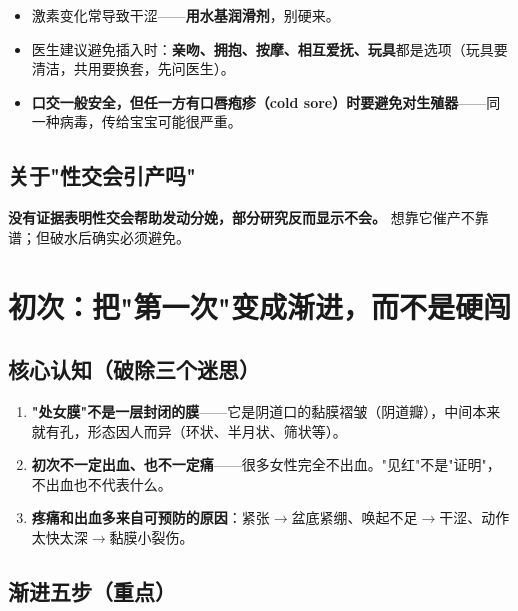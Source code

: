 \documentclass[12pt,UTF8,openany]{ctexbook}
\begin{document}
\begin{itemize}[leftmargin=2em,itemsep=0.3em]
  \item 激素变化常导致干涩——\textbf{用水基润滑剂}，别硬来。
  \item 医生建议避免插入时：\textbf{亲吻、拥抱、按摩、相互爱抚、玩具}都是选项（玩具要清洁，共用要换套，先问医生）。
  \item \textbf{口交一般安全，但任一方有口唇疱疹（cold sore）时要避免对生殖器}——同一种病毒，传给宝宝可能很严重。
\end{itemize}

\subsection{关于"性交会引产吗"}

\textbf{没有证据表明性交会帮助发动分娩，部分研究反而显示不会。} 想靠它催产不靠谱；但破水后确实必须避免。

\section{初次：把"第一次"变成渐进，而不是硬闯}

\subsection{核心认知（破除三个迷思）}

\begin{enumerate}[leftmargin=2em,itemsep=0.3em]
  \item \textbf{"处女膜"不是一层封闭的膜}——它是阴道口的黏膜褶皱（阴道瓣），中间本来就有孔，形态因人而异（环状、半月状、筛状等）。
  \item \textbf{初次不一定出血、也不一定痛}——很多女性完全不出血。"见红"不是"证明"，不出血也不代表什么。
  \item \textbf{疼痛和出血多来自可预防的原因}：紧张$\rightarrow$盆底紧绷、唤起不足$\rightarrow$干涩、动作太快太深$\rightarrow$黏膜小裂伤。
\end{enumerate}

\subsection{渐进五步（重点）}
\end{document}
